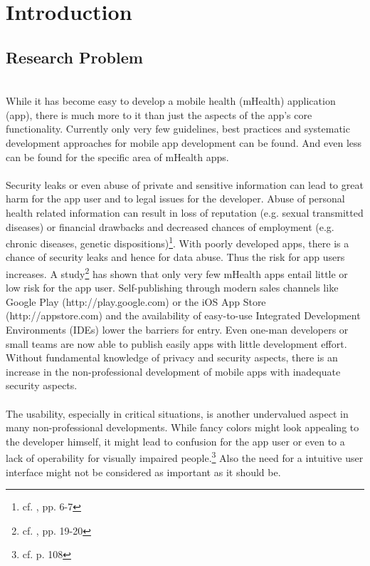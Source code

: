 \section{Introduction}
\subsection{Research Problem}
\\
While it has become easy to develop a mobile health (mHealth) application (app), there is much more to it than just the aspects of the app's core functionality. Currently only very few guidelines, best practices and systematic development approaches for mobile app development can be found. And even less can be found for the specific area of mHealth apps.
\\
\\
Security leaks or even abuse of private and sensitive information can lead to great harm for the app user and to legal issues for the developer. Abuse of personal health related information can result in loss of reputation (e.g. sexual transmitted diseases) or financial drawbacks and decreased chances of employment (e.g. chronic diseases, genetic dispositions)\footnote{cf. \cite{Dehling.2013}, pp. 6-7}. With poorly developed apps, there is a chance of security leaks and hence for data abuse. Thus the risk for app users increases. A study\footnote{cf. \cite{Njie.2013}, pp. 19-20} has shown that only very few mHealth apps entail little or low risk for the app user. Self-publishing through modern sales channels like Google Play (http://play.google.com) or the iOS App Store (http://appstore.com) and the availability of easy-to-use Integrated Development Environments (IDEs) lower the barriers for entry. Even one-man developers or small teams are now able to publish easily apps with little development effort. Without fundamental knowledge of privacy and security aspects, there is an increase in the non-professional development of mobile apps with inadequate security aspects.
\\
\\
The usability, especially in critical situations, is another undervalued aspect in many non-professional developments. While fancy colors might look appealing to the developer himself, it might lead to confusion for the app user or even to a lack of operability for visually impaired people.\footnote{cf. \cite{Badashian.2008} p. 108} Also the need for a intuitive user interface might not be considered as important as it should be.
\\
